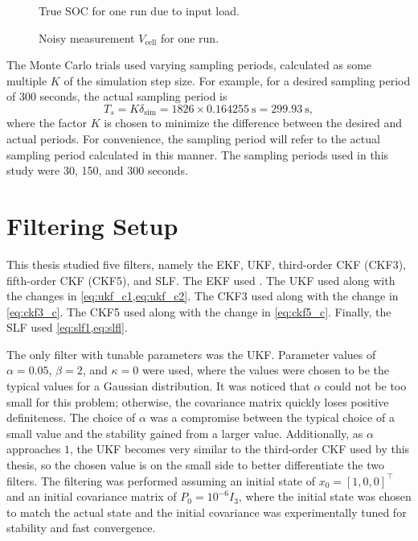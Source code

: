 \documentclass[../zhang_thesis.tex]{subfiles}
\begin{document}
\begin{figure}[htb]
\centering
%
\caption{True SOC for one run due to input load.}
\label{fig:soc}
\end{figure}

\begin{figure}[htb]
\centering
%
\caption{Noisy measurement $V_\text{cell}$ for one run.}
\label{fig:meas}
\end{figure}

The Monte Carlo trials used varying sampling periods, calculated as some multiple $K$ of the simulation step size. For example, for a desired sampling period of 300 seconds, the actual sampling period is
\begin{equation}
    T_s = K \delta_\text{sim} = 1826 \times 0.164255~\text{s} = 299.93~\text{s},
\end{equation}
where the factor $K$ is chosen to minimize the difference between the desired and actual periods. For convenience, the sampling period will refer to the actual sampling period calculated in this manner. The sampling periods used in this study were 30, 150, and 300 seconds.

\section{Filtering Setup}

This thesis studied five filters, namely the EKF, UKF, third-order CKF (CKF3), fifth-order CKF (CKF5), and SLF. The EKF used . The UKF used  along with the changes in \cref{eq:ukf_c1,eq:ukf_c2}. The CKF3 used  along with the change in \cref{eq:ckf3_c}. The CKF5 used  along with the change in \cref{eq:ckf5_c}. Finally, the SLF used \cref{eq:slf1,eq:slfl}.

The only filter with tunable parameters was the UKF. Parameter values of $\alpha=0.05$, $\beta=2$, and $\kappa=0$ were used, where the values were chosen to be the typical values for a Gaussian distribution. It was noticed that $\alpha$ could not be too small for this problem; otherwise, the covariance matrix quickly loses positive definiteness. The choice of $\alpha$ was a compromise between the typical choice of a small value and the stability gained from a larger value. Additionally, as
$\alpha$ approaches $1$, the UKF becomes very similar to the third-order CKF used by this thesis, so the chosen value is on the small side to better differentiate the two filters. The filtering was performed assuming an initial state of $x_0=[1,0,0]^\top$ and an initial covariance matrix of $P_0=10^{-6} I_3$, where the initial state was chosen to match the actual state and the initial covariance was experimentally tuned for stability and fast convergence.
\end{document}
